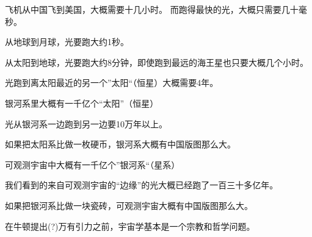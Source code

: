 \documentclass[CJK]{beamer}
\begin{document}
\begin{frame}
  \bch
  飞机从中国飞到美国，大概需要十几小时。
  而跑得最快的光，大概只需要几十毫秒。
  \ech
\end{frame}


\begin{frame}
  \bch

 \bcenter 
  从地球到月球，光要跑大约1秒。
  \ecenter
  \ech
\end{frame}


\begin{frame}
  \bch
 \bcenter 
 从太阳到地球，光要跑大约8分钟，即使跑到最远的海王星也只要大概几个小时。
  \ecenter
  \ech
\end{frame}


\begin{frame}
  \bch
 \bcenter 
 光跑到离太阳最近的另一个”太阳“（恒星）大概需要4年。
  \ecenter
  \ech
\end{frame}


\begin{frame}
  \bch
  \emini
  银河系里大概有一千亿个“太阳”（恒星）

  \skipline
  
  光从银河系一边跑到另一边要10万年以上。
  \emini

  {\scriptsize 如果把太阳系比做一枚硬币，银河系大概有中国版图那么大。}

  \ech
\end{frame}


\begin{frame}
  \bch
  \emini
  可观测宇宙中大概有一千亿个”银河系“（星系）

  \skipline
  
  我们看到的来自可观测宇宙的“边缘”的光大概已经跑了一百三十多亿年。
  \emini

  {\scriptsize 如果把银河系比做一块瓷砖，可观测宇宙大概有中国版图那么大。}
  
  \ech
\end{frame}

\begin{frame}
  \bch
  在牛顿提出(?)万有引力之前，宇宙学基本是一个宗教和哲学问题。
  \ech
\end{frame}
\end{document}
